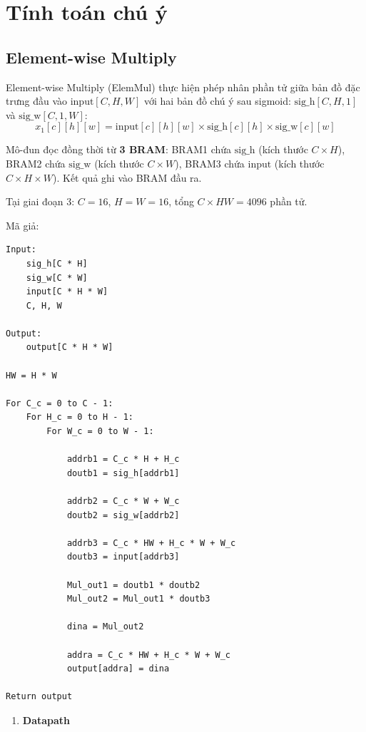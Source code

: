 \documentclass{uetgraduation}
\begin{document}
\section{Tính toán chú ý}
\subsection{Element-wise Multiply}
Element-wise Multiply (ElemMul) thực hiện phép nhân phần tử giữa bản đồ đặc trưng
đầu vào $\text{input}[C, H, W]$ với hai bản đồ chú ý sau sigmoid:
$\text{sig\_h}[C, H, 1]$ và $\text{sig\_w}[C, 1, W]$:
\begin{equation}
    x_1[c][h][w] = \text{input}[c][h][w] \times
    \text{sig\_h}[c][h] \times \text{sig\_w}[c][w]
\end{equation}

Mô-đun đọc đồng thời từ \textbf{3 BRAM}: BRAM1 chứa $\text{sig\_h}$
(kích thước $C \times H$), BRAM2 chứa $\text{sig\_w}$
(kích thước $C \times W$), BRAM3 chứa $\text{input}$
(kích thước $C \times H \times W$). Kết quả ghi vào BRAM đầu ra.

Tại giai đoạn 3: $C = 16$, $H = W = 16$, tổng $C \times HW = 4096$
phần tử.

Mã giả:
\begin{Verbatim}[frame=single]
Input:
    sig_h[C * H]
    sig_w[C * W]
    input[C * H * W]
    C, H, W

Output:
    output[C * H * W]

HW = H * W

For C_c = 0 to C - 1:
    For H_c = 0 to H - 1:
        For W_c = 0 to W - 1:

            addrb1 = C_c * H + H_c
            doutb1 = sig_h[addrb1]

            addrb2 = C_c * W + W_c
            doutb2 = sig_w[addrb2]

            addrb3 = C_c * HW + H_c * W + W_c
            doutb3 = input[addrb3]

            Mul_out1 = doutb1 * doutb2
            Mul_out2 = Mul_out1 * doutb3

            dina = Mul_out2

            addra = C_c * HW + H_c * W + W_c
            output[addra] = dina

Return output
\end{Verbatim}

\begin{enumerate}
    \item \textbf{Datapath}
\end{enumerate}
\end{document}

